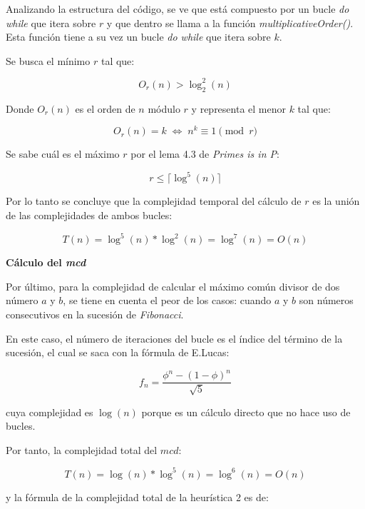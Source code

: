 \documentclass{uc3mpracticas}
\begin{document}
  Analizando la estructura del código, se ve que está compuesto por un bucle \textit{do while} que itera sobre $r$ y que dentro se llama a la función \textit{multiplicativeOrder()}. Esta función tiene a su vez un bucle \textit{do while} que itera sobre $k$.

  \vspace{2mm}

  Se busca el mínimo $r$ tal que:

  $$ O_r(n) > \log_2^2(n) $$

  Donde $O_r(n)$ es el orden de $n$ módulo $r$ y representa el menor $k$ tal que:

  $$ O_r(n) = k \; \Leftrightarrow \; n^k \equiv 1\pmod{r}$$


  Se sabe cuál es el máximo $r$ por el lema 4.3 de \textit{Primes is in P}\cite{primesinp}:

  $$ r \leq \lceil \log^5(n) \rceil $$

  Por lo tanto se concluye que la complejidad temporal del cálculo de $r$ es la unión de las complejidades de ambos bucles:

  $$ T(n) = \log^5(n) * \log^2(n) = \log^7(n) = O(n)$$

  \vspace{2mm}

  \textbf{Cálculo del \textit{mcd}}

  \vspace{2mm}

  Por último, para la complejidad de calcular el máximo común divisor de dos número $a$ y $b$, se tiene en cuenta el peor de los casos: cuando $a$ y $b$ son números consecutivos en la sucesión de \textit{Fibonacci}.

  \vspace{2mm}

  En este caso, el número de iteraciones del bucle es el índice del término de la sucesión, el cual se saca con la fórmula de E.Lucas:

  $$ f_n =\frac{\phi^n - (1-\phi)^n}{\sqrt{5}} $$

  cuya complejidad es $\log(n) $ porque es un cálculo directo que no hace uso de bucles.

  \vspace{2mm}


  Por tanto, la complejidad total del $mcd$:

  $$ T(n) = \log(n) * \log^5(n) = \log^6(n) = O(n)$$

  y la fórmula de la complejidad total de la heurística 2 es de:
\end{document}
